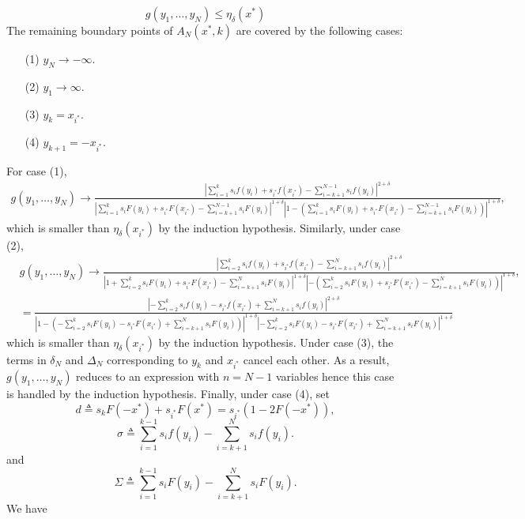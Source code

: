 \[
g(y_1,\ldots,y_N) \leq \eta_{\delta}(x^*)
\]
The remaining boundary points of $A_N(x^*,k)$ are covered by the following cases:
\begin{itemize}
\item[(1)]  $y_N \to -\infty$. 
\item[(2)] $y_1 \to \infty$.
\item[(3)] $y_k = x_{i^*}$.
\item[(4)] $y_{k+1} = -x_{i^*}$. 
\end{itemize}
For case (1), 
\begin{align*}
g(y_1,\ldots,y_N) \to \frac{ \left| \sum_{i=1}^{k} s_i f(y_i) + s_{i^*} f(x_{i^*}) - \sum_{i=k+1}^{N-1} s_i f(y_i) \right|^{2+\delta}} 
{\left| \sum_{i=1}^{k} s_i F(y_i) + s_{i^*} F(x_{i^*}) - \sum_{i=k+1}^{N-1} s_i F(y_i) \right|^{1+\delta}\left|1- \left( \sum_{i=1}^{k} s_i F(y_i) + s_{i^*} F(x_{i^*}) - \sum_{i=k+1}^{N-1} s_i F(y_i) \right)  \right|^{1+\delta} },
\end{align*}
which is smaller than $\eta_\delta(x_{i^*})$ by the induction hypothesis. Similarly, under case (2),
\begin{align*}
& g(y_1,\ldots,y_N) \to 
\frac{ \left| \sum_{i=2}^{k} s_i f(y_i) + s_{i^*} f(x_{i^*}) - \sum_{i=k+1}^{N} s_i f(y_i) \right|^{2+\delta}} 
{\left| 1+ \sum_{i=2}^{k} s_i F(y_i) + s_{i^*} F(x_{i^*}) - \sum_{i=k+1}^{N} s_i F(y_i) \right|^{1+\delta}\left|-\left( \sum_{i=2}^{k} s_i F(y_i) + s_{i^*} F(x_{i^*}) - \sum_{i=k+1}^{N} s_i F(y_i) \right)  \right|^{1+\delta} },
 \\
& = \frac{ \left| -\sum_{i=2}^{k} s_i f(y_i) - s_{i^*} f(x_{i^*}) + \sum_{i=k+1}^{N} s_i f(y_i) \right|^{2+\delta}} 
{ \left|1 - \left(-\sum_{i=2}^{k} s_i F(y_i) - s_{i^*} F(x_{i^*}) + \sum_{i=k+1}^{N} s_i F(y_i) \right) \right|^{1+\delta} 
\left|-\sum_{i=2}^{k} s_i F(y_i) - s_{i^*} F(x_{i^*}) + \sum_{i=k+1}^{N} s_i F(y_i) \right|^{1+\delta} }
\end{align*}
which is smaller than $\eta_{\delta}(x_{i^*})$ by the induction hypothesis. Under case (3), the terms in $\delta_N$ and $\Delta_N$ corresponding to $y_k$ and $x_{i^*}$ cancel each other. As a result,  $g(y_1,\ldots,y_N)$ reduces to an expression with $n=N-1$ variables hence this case is handled by the induction hypothesis. 
%
Finally, under case (4), set 
\[
d \triangleq s_k F(-x^*) + s_{i^*} F(x^*) = s_{i^*}\left(1-2F(-x^*) \right), 
\]
\[
\sigma \triangleq \sum_{i=1}^{k-1} s_i f(y_i) - \sum_{i=k+1}^{N} s_i f(y_i). 
\]
and 
\[
\Sigma \triangleq \sum_{i=1}^{k-1} s_i F(y_i) - \sum_{i=k+1}^{N} s_i F(y_i). 
\]
We have
